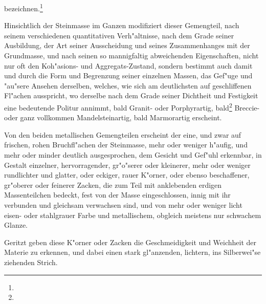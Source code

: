 \documentclass[a4paper, 11pt, oneside, german]{article}
\begin{document}
bezeichnen.\footnote{}

Hinsichtlich der Steinmasse im Ganzen modifiziert dieser Gemengteil, nach seinem verschiedenen quantitativen Verh"altnisse, nach dem Grade seiner Ausbildung, der Art seiner Ausscheidung und seines Zusammenhanges mit der Grundmasse, und nach seinen so mannigfaltig abweichenden Eigenschaften, nicht nur oft den Koh"asions- und Aggregats-Zustand, sondern bestimmt auch damit und durch die Form und Begrenzung seiner einzelnen Massen, das Gef"uge und "au"sere Ansehen derselben, welches, wie sich am deutlichsten auf geschliffenen Fl"achen ausspricht, wo derselbe nach dem Grade seiner Dichtheit und Festigkeit eine bedeutende Politur annimmt, bald Granit- oder Porphyrartig, bald\footnote{} Breccie- oder ganz vollkommen Mandelsteinartig, bald Marmorartig erscheint.

Von den beiden metallischen Gemengteilen erscheint der eine, und zwar auf frischen, rohen Bruchfl"achen der Steinmasse, mehr oder weniger h"aufig, und mehr oder minder deutlich ausgesprochen, dem Gesicht und Gef"uhl erkennbar, in Gestalt einzelner, hervorragender, gr"o"serer oder kleinerer, mehr oder weniger rundlichter und glatter, oder eckiger, rauer K"orner, oder ebenso beschaffener, gr"oberer oder feinerer Zacken, die zum Teil mit anklebenden erdigen Massenteilchen bedeckt, fest von der Masse eingeschlossen, innig mit ihr verbunden und gleichsam verwachsen sind, und von mehr oder weniger licht eisen- oder stahlgrauer Farbe und metallischem, obgleich meistens nur schwachem Glanze.

Geritzt geben diese K"orner oder Zacken die Geschmeidigkeit und Weichheit der Materie zu erkennen, und dabei einen stark gl"anzenden, lichtern, ins Silberwei"se ziehenden Strich.
\end{document}
